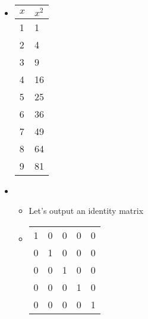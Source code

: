 \begin{itemize}
\item \begin{tabular}{|l|l|}
\hline
$x$ & $x^2$\\
\hline
1 & 1\\
\hline
2 & 4\\
\hline
3 & 9\\
\hline
4 & 16\\
\hline
5 & 25\\
\hline
6 & 36\\
\hline
7 & 49\\
\hline
8 & 64\\
\hline
9 & 81\\
\hline
\end{tabular}
\item \begin{itemize}
\item Let's output an identity matrix
\item \begin{tabular}{ l l l l l }

1 & 0 & 0 & 0 & 0\\

0 & 1 & 0 & 0 & 0\\

0 & 0 & 1 & 0 & 0\\

0 & 0 & 0 & 1 & 0\\

0 & 0 & 0 & 0 & 1\\


\end{tabular}
\end{itemize}
\end{itemize}
